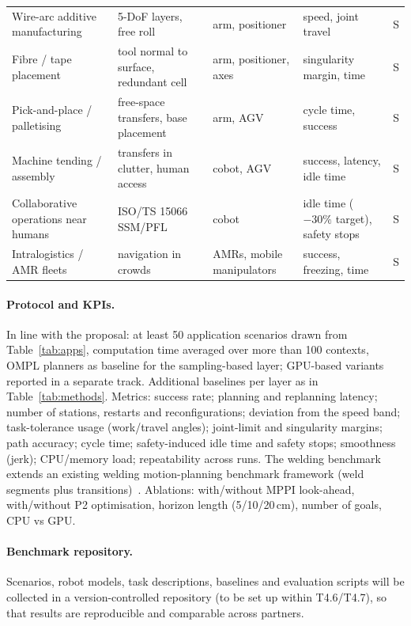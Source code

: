 \documentclass[10pt,a4paper]{article}
\begin{document}
\begin{longtable}{@{}L{2.9cm}L{4.6cm}L{3.1cm}L{2.3cm}L{1.3cm}@{}}
Wire-arc additive manufacturing & 5-DoF layers, free roll~\cite{dharmawan2018functional} & arm, positioner & speed, joint travel & S \\
Fibre / tape placement & tool normal to surface, redundant cell~\cite{farzanehkaloorazi2018pathplacement} & arm, positioner, axes & singularity margin, time & S \\
Pick-and-place / palletising & free-space transfers, base placement~\cite{wachter2024tcpbase} & arm, AGV & cycle time, success & S \\
Machine tending / assembly & transfers in clutter, human access & cobot, AGV & success, latency, idle time & S \\
Collaborative operations near humans & ISO/TS 15066 SSM/PFL~\cite{faroni2022safetyaware,gursoy2026cosmik} & cobot & idle time ($-30\%$ target), safety stops & S \\
Intralogistics / AMR fleets & navigation in crowds~\cite{trevisan2025drampi,macenski2023nav2survey} & AMRs, mobile manipulators & success, freezing, time & S \\
\bottomrule
\end{longtable}

\paragraph{Protocol and KPIs.} In line with the proposal: at least 50 application scenarios drawn from Table~\ref{tab:apps}, computation time averaged over more than 100 contexts, OMPL planners as baseline for the sampling-based layer; GPU-based variants reported in a separate track. Additional baselines per layer as in Table~\ref{tab:methods}. Metrics: success rate; planning and replanning latency; number of stations, restarts and reconfigurations; deviation from the speed band; task-tolerance usage (work/travel angles); joint-limit and singularity margins; path accuracy; cycle time; safety-induced idle time and safety stops; smoothness (jerk); CPU/memory load; repeatability across runs. The welding benchmark extends an existing welding motion-planning benchmark framework (weld segments plus transitions)~\cite{demaeyer2021weldbenchmark}. Ablations: with/without MPPI look-ahead, with/without P2 optimisation, horizon length (5/10/20\,cm), number of goals, CPU vs GPU.

\paragraph{Benchmark repository.} Scenarios, robot models, task descriptions, baselines and evaluation scripts will be collected in a version-controlled repository (to be set up within T4.6/T4.7), so that results are reproducible and comparable across partners.
\end{document}
